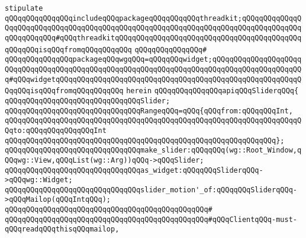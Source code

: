 \newline
\verb|stipulate|\newline
\verb|qQQqqQQqqQQqqQQqincludeqQQqpackageqQQqqQQqqQQqthreadkit;qQQqqQQqqQQqqQQqqQQqqQQqqQQqqQQqqQQqqQQqqQQqqQQqqQQqqQQqqQQqqQQqqQQqqQQqqQQqqQQqqQQqqQQqqQQqqQQq#qQQqthreadkitqQQqqQQqqQQqqQQqqQQqqQQqqQQqqQQqqQQqqQQqqQQqqQQqqQQqisqQQqfromqQQqqQQqqQQq|\newline
\verb|qQQqqQQqqQQqqQQq#|\newline
\verb|qQQqqQQqqQQqqQQqpackageqQQqwgqQQq=qQQqqQQqwidget;qQQqqQQqqQQqqQQqqQQqqQQqqQQqqQQqqQQqqQQqqQQqqQQqqQQqqQQqqQQqqQQqqQQqqQQqqQQqqQQqqQQqqQQqqQQq#qQQqwidgetqQQqqQQqqQQqqQQqqQQqqQQqqQQqqQQqqQQqqQQqqQQqqQQqqQQqqQQqqQQqqQQqisqQQqfromqQQqqQQqqQQq|\newline
\verb|herein|\newline
\newline
\verb|qQQqqQQqqQQqqQQqapiqQQqSliderqQQq{|\newline
\newline
\verb|qQQqqQQqqQQqqQQqqQQqqQQqqQQqqQQqSlider;|\newline
\newline
\verb|qQQqqQQqqQQqqQQqqQQqqQQqqQQqqQQqRangeqQQq=qQQq{qQQqfrom:qQQqqQQqInt,|\newline
\verb|qQQqqQQqqQQqqQQqqQQqqQQqqQQqqQQqqQQqqQQqqQQqqQQqqQQqqQQqqQQqqQQqqQQqqQQqto:qQQqqQQqqQQqqQQqInt|\newline
\verb|qQQqqQQqqQQqqQQqqQQqqQQqqQQqqQQqqQQqqQQqqQQqqQQqqQQqqQQqqQQqqQQq};|\newline
\newline
\verb|qQQqqQQqqQQqqQQqqQQqqQQqqQQqqQQqmake_slider:qQQqqQQq(wg::Root_Window,qQQqwg::View,qQQqList(wg::Arg))qQQq->qQQqSlider;|\newline
\newline
\newline
\verb|qQQqqQQqqQQqqQQqqQQqqQQqqQQqqQQqas_widget:qQQqqQQqSliderqQQq->qQQqwg::Widget;|\newline
\newline
\verb|qQQqqQQqqQQqqQQqqQQqqQQqqQQqqQQqslider_motion'_of:qQQqqQQqSliderqQQq->qQQqMailop(qQQqIntqQQq);|\newline
\verb|qQQqqQQqqQQqqQQqqQQqqQQqqQQqqQQqqQQqqQQqqQQqqQQq#|\newline
\verb|qQQqqQQqqQQqqQQqqQQqqQQqqQQqqQQqqQQqqQQqqQQqqQQq#qQQqClientqQQq-must-qQQqreadqQQqthisqQQqmailop,|\newline
